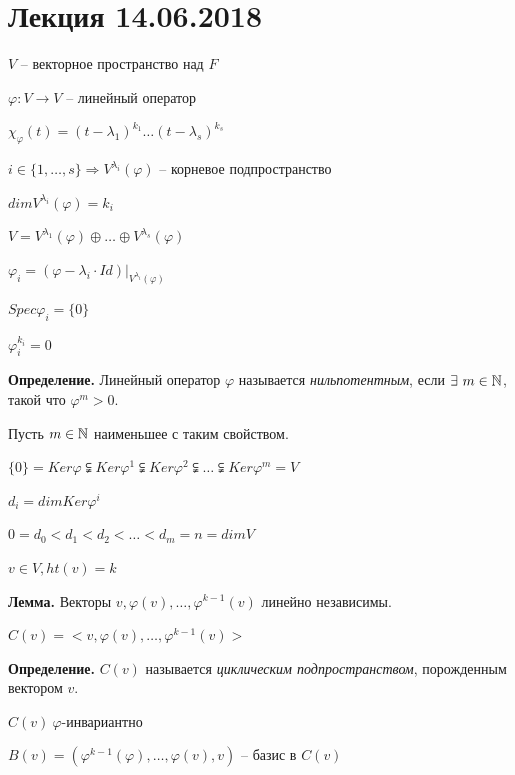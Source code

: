 \section{Лекция 14.06.2018}

$V$ -- векторное пространство над $F$

$\varphi: V \rightarrow V$ -- линейный оператор

$\chi_{\varphi} (t) = (t - \lambda_1)^{k_1} \dots (t - \lambda_s)^{k_s}$

$i \in \{1, \dots, s\} \Rightarrow V^{\lambda_i} (\varphi)$ -- корневое подпространство

$dim V^{\lambda_i} (\varphi) = k_i$

$V = V^{\lambda_1} (\varphi) \oplus \dots \oplus V^{\lambda_s} (\varphi)$

$\varphi_i = (\varphi - \lambda_i \cdot Id) | _{V^{\lambda_i} (\varphi)}$

$Spec \varphi_i = \{0\}$

$\varphi_i^{k_i} = 0$

\vspace{\baselineskip}
\textbf{Определение.} Линейный оператор $\varphi$ называется \textit{нильпотентным}, если $\exists \ m \in \mathbb{N}$, такой что $\varphi^m > 0$.

\vspace{\baselineskip}
Пусть $m \in \mathbb{N}$ наименьшее с таким свойством.

$\{0\} = Ker \varphi \subsetneqq Ker \varphi^1 \subsetneqq Ker \varphi^2 \subsetneqq \dots \subsetneqq Ker \varphi^m = V$

$d_i = dim Ker \varphi^i$

$0 = d_0 < d_1 < d_2 < \dots < d_m = n = dim V$

$v \in V, ht(v) = k$

\vspace{\baselineskip}
\textbf{Лемма.} Векторы $v, \varphi(v), \dots, \varphi^{k-1}(v)$ линейно независимы.

\vspace{\baselineskip}
$C(v) = <v, \varphi(v), \dots, \varphi^{k-1} (v)>$

\vspace{\baselineskip}
\textbf{Определение.} $C(v)$ называется \textit{циклическим подпространством}, порожденным вектором $v$.

\vspace{\baselineskip}
$C(v) \ \varphi$-инвариантно

\vspace{\baselineskip}
$B(v) = (\varphi^{k-1} (\varphi), \dots, \varphi(v), v)$ -- базис в $C(v)$


